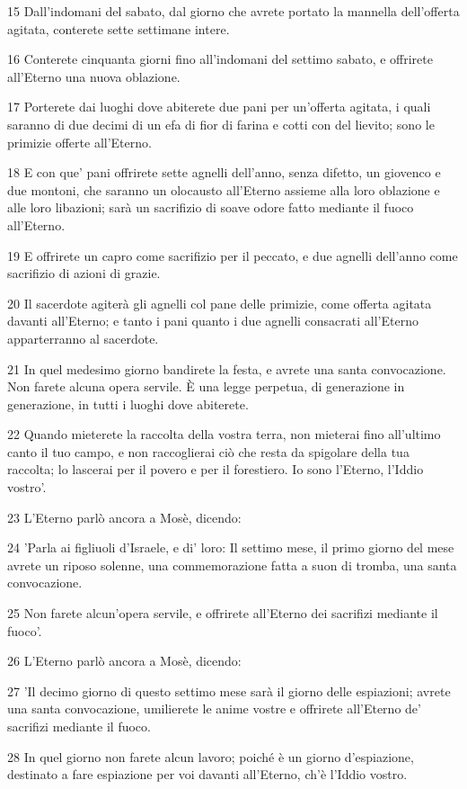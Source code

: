 \par 15 Dall'indomani del sabato, dal giorno che avrete portato la mannella dell'offerta agitata, conterete sette settimane intere.
\par 16 Conterete cinquanta giorni fino all'indomani del settimo sabato, e offrirete all'Eterno una nuova oblazione.
\par 17 Porterete dai luoghi dove abiterete due pani per un'offerta agitata, i quali saranno di due decimi di un efa di fior di farina e cotti con del lievito; sono le primizie offerte all'Eterno.
\par 18 E con que' pani offrirete sette agnelli dell'anno, senza difetto, un giovenco e due montoni, che saranno un olocausto all'Eterno assieme alla loro oblazione e alle loro libazioni; sarà un sacrifizio di soave odore fatto mediante il fuoco all'Eterno.
\par 19 E offrirete un capro come sacrifizio per il peccato, e due agnelli dell'anno come sacrifizio di azioni di grazie.
\par 20 Il sacerdote agiterà gli agnelli col pane delle primizie, come offerta agitata davanti all'Eterno; e tanto i pani quanto i due agnelli consacrati all'Eterno apparterranno al sacerdote.
\par 21 In quel medesimo giorno bandirete la festa, e avrete una santa convocazione. Non farete alcuna opera servile. È una legge perpetua, di generazione in generazione, in tutti i luoghi dove abiterete.
\par 22 Quando mieterete la raccolta della vostra terra, non mieterai fino all'ultimo canto il tuo campo, e non raccoglierai ciò che resta da spigolare della tua raccolta; lo lascerai per il povero e per il forestiero. Io sono l'Eterno, l'Iddio vostro'.
\par 23 L'Eterno parlò ancora a Mosè, dicendo:
\par 24 'Parla ai figliuoli d'Israele, e di' loro: Il settimo mese, il primo giorno del mese avrete un riposo solenne, una commemorazione fatta a suon di tromba, una santa convocazione.
\par 25 Non farete alcun'opera servile, e offrirete all'Eterno dei sacrifizi mediante il fuoco'.
\par 26 L'Eterno parlò ancora a Mosè, dicendo:
\par 27 'Il decimo giorno di questo settimo mese sarà il giorno delle espiazioni; avrete una santa convocazione, umilierete le anime vostre e offrirete all'Eterno de' sacrifizi mediante il fuoco.
\par 28 In quel giorno non farete alcun lavoro; poiché è un giorno d'espiazione, destinato a fare espiazione per voi davanti all'Eterno, ch'è l'Iddio vostro.
